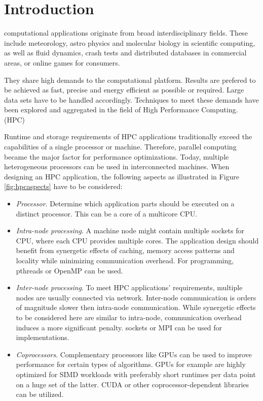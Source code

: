 \section{Introduction}

 computational applications originate from broad interdisciplinary fields. These include meteorology, astro physics and molecular biology in scientific computing, as well as fluid dynamics, crash tests and distributed databases in commercial areas, or online games for consumers.

They share high demands to the computational platform. Results are prefered to be achieved as fast, precise and energy efficient as possible or required. Large data sets have to be handled accordingly. Techniques to meet these demands have been explored and aggregated in the field of High Performance Computing. (HPC)

Runtime and storage requirements of HPC applications traditionally exceed the capabilities of a single processor or machine. Therefore, parallel computing became the major factor for performance optimizations. Today, multiple heterogeneous processors can be used in interconnected machines. When designing an HPC application, the following aspects as illustrated in Figure \ref{fig:hpcaspects} have to be considered:

\begin{itemize}

\item \textit{Processor}. Determine which application parts should be executed on a distinct processor. This can be a core of a multicore CPU.

\item \textit{Intra-node processing}. A machine node might contain multiple sockets for CPU, where each CPU provides multiple cores. The application design should benefit from synergetic effects of caching, memory access patterns and locality while minimizing communication overhead. For programming, pthreads or OpenMP can be used.

\item \textit{Inter-node processing}. To meet HPC applications' requirements, multiple nodes are usually connected via network. Inter-node communication is orders of magnitude slower then intra-node communication. While synergetic effects to be considered here are similar to intra-node, communication overhead induces a more significant penalty. sockets or MPI can be used for implementations.

\item \textit{Coprocessors}. Complementary processors like GPUs can be used to improve performance for certain types of algorithms. GPUs for example are highly optimized for SIMD workloads with preferably short runtimes per data point on a huge set of the latter. CUDA or other coprocessor-dependent libraries can be utilized.

\end{itemize}

